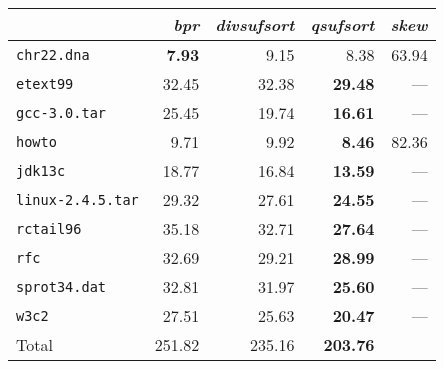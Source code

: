 \begin{tabular}{l r r r r } \toprule
 & \emph{bpr} & \emph{divsufsort} & \emph{qsufsort} & \emph{skew}\\ \midrule
\texttt{chr22.dna} & \textbf{7.93} & 9.15 & 8.38 & 63.94\\
\texttt{etext99} & 32.45 & 32.38 & \textbf{29.48} & ---\\
\texttt{gcc-3.0.tar} & 25.45 & 19.74 & \textbf{16.61} & ---\\
\texttt{howto} & 9.71 & 9.92 & \textbf{8.46} & 82.36\\
\texttt{jdk13c} & 18.77 & 16.84 & \textbf{13.59} & ---\\
\texttt{linux-2.4.5.tar} & 29.32 & 27.61 & \textbf{24.55} & ---\\
\texttt{rctail96} & 35.18 & 32.71 & \textbf{27.64} & ---\\
\texttt{rfc} & 32.69 & 29.21 & \textbf{28.99} & ---\\
\texttt{sprot34.dat} & 32.81 & 31.97 & \textbf{25.60} & ---\\
\texttt{w3c2} & 27.51 & 25.63 & \textbf{20.47} & ---\\
 \midrule
Total & 251.82 & 235.16 & \textbf{203.76} & \\
 \bottomrule
\end{tabular}
